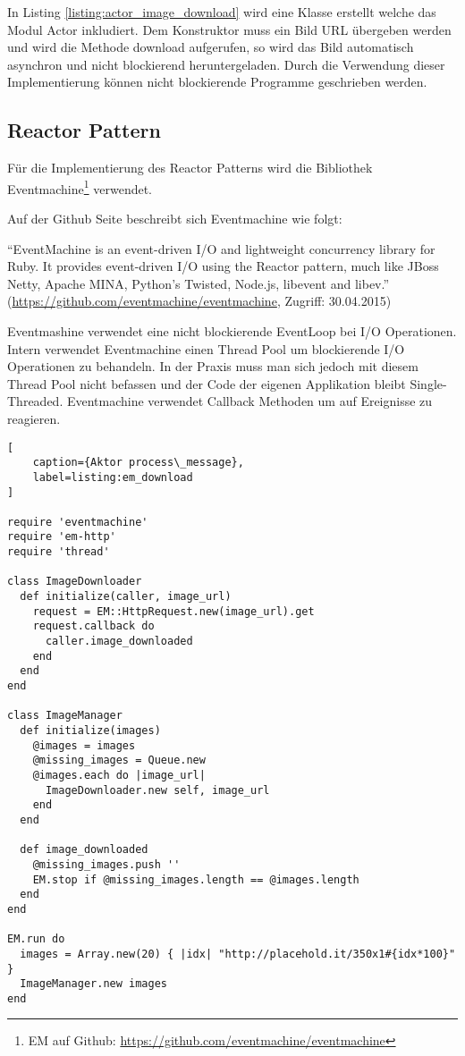 In Listing \ref{listing:actor_image_download} wird eine Klasse erstellt welche das Modul Actor inkludiert. Dem Konstruktor muss ein Bild URL übergeben werden und wird die Methode download aufgerufen, so wird das Bild automatisch asynchron und nicht blockierend heruntergeladen. Durch die Verwendung dieser Implementierung können nicht blockierende Programme geschrieben werden. 

\subsection{Reactor Pattern}
Für die Implementierung des Reactor Patterns wird die Bibliothek Eventmachine\footnote{EM auf Github: \url{https://github.com/eventmachine/eventmachine}} verwendet. 

Auf der Github Seite beschreibt sich Eventmachine wie folgt: 

	``EventMachine is an event-driven I/O and lightweight concurrency library for Ruby. It provides event-driven I/O using the Reactor pattern, much like JBoss Netty, Apache MINA, Python's Twisted, Node.js, libevent and libev.'' (\url{https://github.com/eventmachine/eventmachine}, Zugriff: 30.04.2015)

Eventmashine verwendet eine nicht blockierende EventLoop bei I/O Operationen. Intern verwendet Eventmachine einen Thread Pool um blockierende I/O Operationen zu behandeln. In der Praxis muss man sich jedoch mit diesem Thread Pool nicht befassen und der Code der eigenen Applikation bleibt Single-Threaded. Eventmachine verwendet Callback Methoden um auf Ereignisse zu reagieren. 

\begin{lstlisting}[
	caption={Aktor process\_message},
	label=listing:em_download
]

require 'eventmachine'
require 'em-http'
require 'thread'

class ImageDownloader
  def initialize(caller, image_url)
    request = EM::HttpRequest.new(image_url).get
    request.callback do
      caller.image_downloaded
    end
  end
end

class ImageManager
  def initialize(images)
    @images = images
    @missing_images = Queue.new
    @images.each do |image_url|
      ImageDownloader.new self, image_url
    end
  end

  def image_downloaded
    @missing_images.push ''
    EM.stop if @missing_images.length == @images.length
  end
end

EM.run do
  images = Array.new(20) { |idx| "http://placehold.it/350x1#{idx*100}" }
  ImageManager.new images
end
\end{lstlisting}

